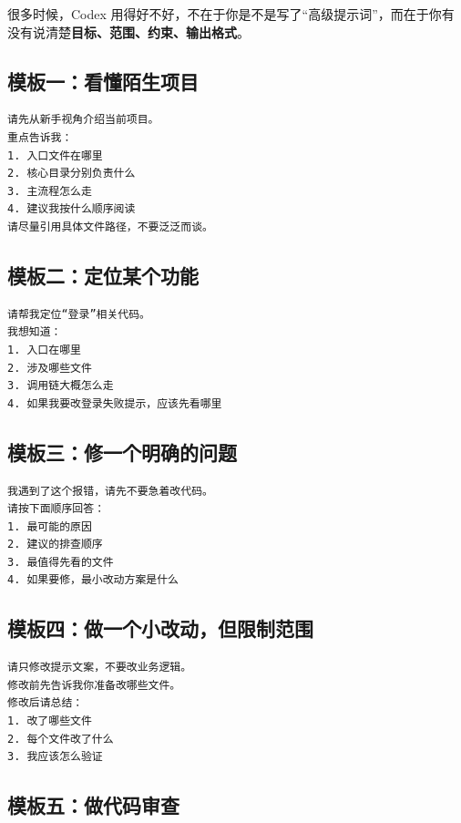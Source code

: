 \documentclass[UTF8,a4paper,12pt]{ctexart}
\begin{document}
很多时候，Codex 用得好不好，不在于你是不是写了“高级提示词”，而在于你有没有说清楚\textbf{目标、范围、约束、输出格式}。

\subsection{模板一：看懂陌生项目}

\begin{lstlisting}[style=prompt]
请先从新手视角介绍当前项目。
重点告诉我：
1. 入口文件在哪里
2. 核心目录分别负责什么
3. 主流程怎么走
4. 建议我按什么顺序阅读
请尽量引用具体文件路径，不要泛泛而谈。
\end{lstlisting}

\subsection{模板二：定位某个功能}

\begin{lstlisting}[style=prompt]
请帮我定位“登录”相关代码。
我想知道：
1. 入口在哪里
2. 涉及哪些文件
3. 调用链大概怎么走
4. 如果我要改登录失败提示，应该先看哪里
\end{lstlisting}

\subsection{模板三：修一个明确的问题}

\begin{lstlisting}[style=prompt]
我遇到了这个报错，请先不要急着改代码。
请按下面顺序回答：
1. 最可能的原因
2. 建议的排查顺序
3. 最值得先看的文件
4. 如果要修，最小改动方案是什么
\end{lstlisting}

\subsection{模板四：做一个小改动，但限制范围}

\begin{lstlisting}[style=prompt]
请只修改提示文案，不要改业务逻辑。
修改前先告诉我你准备改哪些文件。
修改后请总结：
1. 改了哪些文件
2. 每个文件改了什么
3. 我应该怎么验证
\end{lstlisting}

\subsection{模板五：做代码审查}
\end{document}
